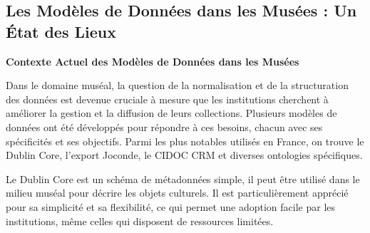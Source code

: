 \subsection{Les Modèles de Données dans les Musées : Un État des Lieux}
\textbf{Contexte Actuel des Modèles de Données dans les Musées}\newline

Dans le domaine muséal, la question de la normalisation et de la structuration des données est devenue cruciale à mesure que les institutions cherchent à améliorer la gestion et la diffusion de leurs collections. Plusieurs modèles de données ont été développés pour répondre à ces besoins, chacun avec ses spécificités et ses objectifs. Parmi les plus notables utilisés en France, on trouve le Dublin Core, l'export Joconde, le CIDOC CRM et diverses ontologies spécifiques.\newline

Le Dublin Core est un schéma de métadonnées simple, il peut être utilisé dans le milieu muséal pour décrire les objets culturels. Il est particulièrement apprécié pour sa simplicité et sa flexibilité, ce qui permet une adoption facile par les institutions, même celles qui disposent de ressources limitées.\newline



